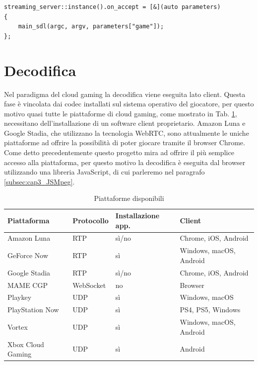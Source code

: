 \begin{lstlisting}[caption=Codice relativo alla callback di avvenuta connessione. File: osd/sdl/sdlmain.cpp, label={lst:sdlmain_callback}]
streaming_server::instance().on_accept = [&](auto parameters)
{
	main_sdl(argc, argv, parameters["game"]);
};
\end{lstlisting}




\section{Decodifica}
Nel paradigma del cloud gaming la decodifica viene eseguita lato client. Questa fase è vincolata dai codec installati sul sistema operativo del giocatore, per questo motivo quasi tutte le piattaforme di cloud gaming, come mostrato in Tab. \ref{table:ClientPerCloudGaming}, necessitano dell'installazione di un software client proprietario. Amazon Luna e Google Stadia, che utilizzano la tecnologia WebRTC, sono attualmente le uniche piattaforme ad offrire la possibilità di poter giocare tramite il browser Chrome. Come detto precedentemente questo progetto mira ad offrire il più semplice accesso alla piattaforma, per questo motivo la decodifica è eseguita dal browser utilizzando una libreria JavaScript, di cui parleremo nel paragrafo \ref{subsec:cap3_JSMpeg}.

\begin{table}[H]
	\centering
	\begin{tabular}{||l l l l||} 
		\hline
		Piattaforma & Protocollo & Installazione app. & Client \\
		\hline\hline
		Amazon Luna & RTP & sì/no & Chrome, iOS, Android \\
		\hline
		GeForce Now & RTP & sì & Windows, macOS, Android \\
		\hline
		Google Stadia & RTP & sì/no & Chrome, iOS, Android \\
		\hline
		MAME CGP & WebSocket & no & Browser \\
		\hline
		Playkey & UDP & sì & Windows, macOS \\
		\hline
		PlayStation Now & UDP & sì & PS4, PS5, Windows \\
		\hline
		Vortex & UDP & sì & Windows, macOS, Android \\
		\hline		
		Xbox Cloud Gaming & UDP & sì & Android \\
		\hline
	\end{tabular}

	\caption{Piattaforme disponibili}
	\label{table:ClientPerCloudGaming}
\end{table}

